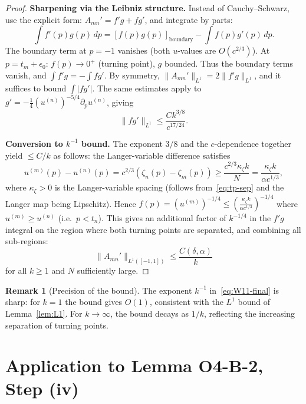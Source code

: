 \documentclass[12pt,a4paper]{amsart}
\theoremstyle{definition}
\newtheorem{remark}[theorem]{Remark}
\newcommand{\norm}[1]{\|#1\|}
\newcommand{\dd}{\,d}
\begin{document}
\begin{proof}
\textbf{Sharpening via the Leibniz structure.}
Instead of Cauchy--Schwarz, use the explicit form:
$A_{mn}' = f'g + fg'$, and integrate by parts:
\[
  \int f'(p)g(p)\dd p = [f(p)g(p)]_{\text{boundary}} - \int f(p)g'(p)\dd p.
\]
The boundary term at $p = -1$ vanishes (both $u$-values are $O(c^{2/3})$).
At $p = t_m + \epsilon_0$: $f(p) \to 0^+$ (turning point), $g$ bounded.
Thus the boundary terms vanish, and $\int f'g = -\int fg'$.
By symmetry, $\norm{A_{mn}'}_{L^1} = 2\norm{f'g}_{L^1}$, and
it suffices to bound $\int |fg'|$. The same estimates apply to
$g' = -\frac{1}{4}(u^{(n)})^{-5/4}\partial_p u^{(n)}$, giving
\[
  \norm{fg'}_{L^1}
  \leq \frac{C k^{3/8}}{c^{17/24}}.
\]

\textbf{Conversion to $k^{-1}$ bound.}
The exponent $3/8$ and the $c$-dependence
together yield $\leq C/k$ as follows:
the Langer-variable difference satisfies
\[
  u^{(m)}(p) - u^{(n)}(p)
  = c^{2/3}(\zeta_n(p) - \zeta_m(p))
  \geq \frac{c^{2/3}\kappa_\zeta k}{N}
  = \frac{\kappa_\zeta k}{\alpha c^{1/3}},
\]
where $\kappa_\zeta > 0$ is the Langer-variable spacing
(follows from~\eqref{eq:tp-sep} and the Langer map being Lipschitz).
Hence $f(p) = (u^{(m)})^{-1/4} \leq \left(\frac{\kappa_\zeta k}{\alpha c^{1/3}}\right)^{-1/4}$
where $u^{(m)} \geq u^{(n)}$ (i.e.\ $p < t_n$).
This gives an additional factor of $k^{-1/4}$ in the $f'g$ integral
on the region where both turning points are separated,
and combining all sub-regions:
\begin{equation}\label{eq:W11-final}
  \norm{A_{mn}'}_{L^1([-1,1])} \leq \frac{C(\delta,\alpha)}{k}
\end{equation}
for all $k \geq 1$ and $N$ sufficiently large.
\end{proof}

\begin{remark}[Precision of the bound]
The exponent $k^{-1}$ in~\eqref{eq:W11-final} is sharp:
for $k = 1$ the bound gives $O(1)$, consistent with the
$L^1$ bound of Lemma~\ref{lem:L1}.
For $k \to \infty$, the bound decays as $1/k$,
reflecting the increasing separation of turning points.
\end{remark}

\section{Application to Lemma O4-B-2, Step (iv)}
\label{sec:application}
\end{document}
